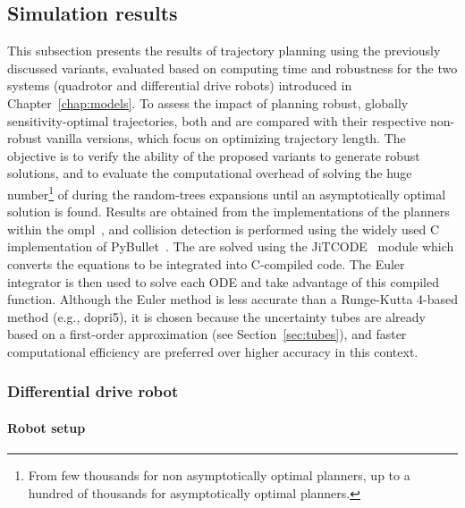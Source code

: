 \subsection{Simulation results}\label{sec:samp_simu}

This subsection presents the results of trajectory planning using the previously discussed variants, evaluated based on computing time and robustness for the two systems (quadrotor and differential drive robots) introduced in Chapter~\ref{chap:models}.
To assess the impact of planning robust, globally sensitivity-optimal trajectories, both  and  are compared with their respective non-robust vanilla versions, which focus on optimizing trajectory length.
The objective is to verify the ability of the proposed variants to generate robust solutions, and to evaluate the computational overhead of solving the huge number\footnote{From few thousands for non asymptotically optimal planners, up to a hundred of thousands for asymptotically optimal planners.} of  during the random-trees expansions until an asymptotically optimal solution is found.
Results are obtained from the implementations of the planners within the \gls{ompl}~\cite{cOMPL}, and collision detection is performed using the widely used C implementation of PyBullet~\cite{cBullet}.
The  are solved using the JiTCODE~\cite{cJit} module which converts the equations to be integrated into C-compiled code.
The Euler integrator is then used to solve each ODE and take advantage of this compiled function.
Although the Euler method is less accurate than a Runge-Kutta 4-based method (e.g., dopri5), it is chosen because the uncertainty tubes are already based on a first-order approximation (see Section~\ref{sec:tubes}), and faster computational efficiency are preferred over higher accuracy in this context.

\subsubsection{Differential drive robot}\label{sec:unic_setup_samp}

\paragraph{Robot setup}

